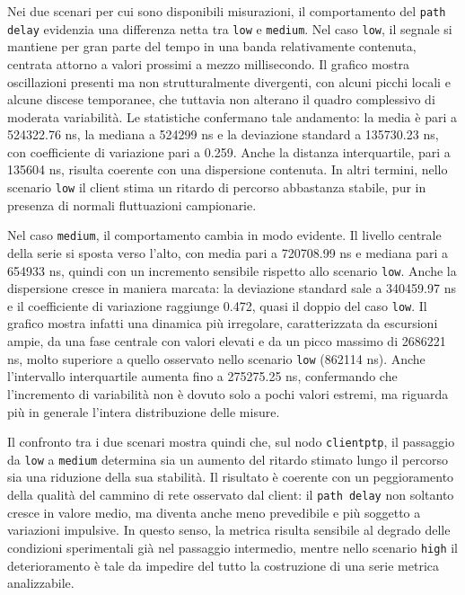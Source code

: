 Nei due scenari per cui sono disponibili misurazioni, il comportamento del \texttt{path
delay} evidenzia una differenza netta tra \texttt{low} e \texttt{medium}. Nel caso
\texttt{low}, il segnale si mantiene per gran parte del tempo in una banda relativamente
contenuta, centrata attorno a valori prossimi a mezzo millisecondo. Il grafico mostra
oscillazioni presenti ma non strutturalmente divergenti, con alcuni picchi
locali e alcune discese temporanee, che tuttavia non alterano il quadro complessivo
di moderata variabilità. Le statistiche confermano tale andamento: la media è pari
a 524322.76 ns, la mediana a 524299 ns e la deviazione standard a 135730.23 ns, con
coefficiente di variazione pari a 0.259. Anche la distanza interquartile, pari a 135604
ns, risulta coerente con una dispersione contenuta. In altri termini, nello
scenario \texttt{low} il client stima un ritardo di percorso abbastanza stabile,
pur in presenza di normali fluttuazioni campionarie.

Nel caso \texttt{medium}, il comportamento cambia in modo evidente. Il livello centrale
della serie si sposta verso l’alto, con media pari a 720708.99 ns e mediana pari
a 654933 ns, quindi con un incremento sensibile rispetto allo scenario \texttt{low}.
Anche la dispersione cresce in maniera marcata: la deviazione standard sale a
340459.97 ns e il coefficiente di variazione raggiunge 0.472, quasi il doppio del
caso \texttt{low}. Il grafico mostra infatti una dinamica più irregolare,
caratterizzata da escursioni ampie, da una fase centrale con valori elevati e da un
picco massimo di 2686221 ns, molto superiore a quello osservato nello scenario
\texttt{low} (862114 ns). Anche l’intervallo interquartile aumenta fino a
275275.25 ns, confermando che l’incremento di variabilità non è dovuto solo a pochi
valori estremi, ma riguarda più in generale l’intera distribuzione delle misure.

Il confronto tra i due scenari mostra quindi che, sul nodo \texttt{clientptp}, il
passaggio da \texttt{low} a \texttt{medium} determina sia un aumento del ritardo stimato
lungo il percorso sia una riduzione della sua stabilità. Il risultato è coerente
con un peggioramento della qualità del cammino di rete osservato dal client: il \texttt{path
delay} non soltanto cresce in valore medio, ma diventa anche meno prevedibile e più
soggetto a variazioni impulsive. In questo senso, la metrica risulta sensibile al
degrado delle condizioni sperimentali già nel passaggio intermedio, mentre nello
scenario \texttt{high} il deterioramento è tale da impedire del tutto la costruzione
di una serie metrica analizzabile.


